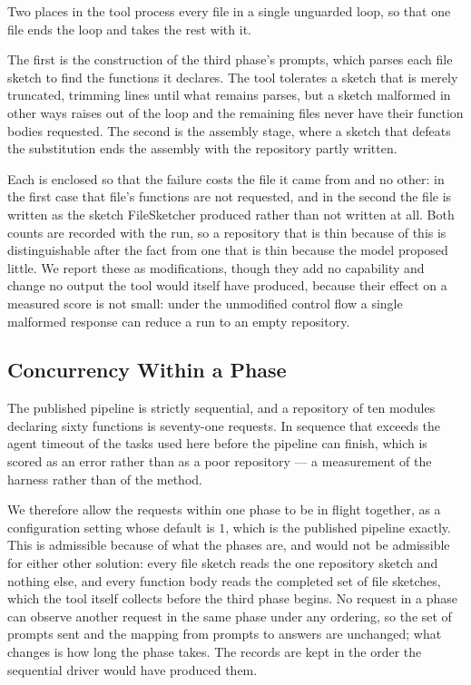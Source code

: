 Two places in the tool process every file in a single unguarded loop, so that
one file ends the loop and takes the rest with it.

The first is the construction of the third phase's prompts, which parses each
file sketch to find the functions it declares. The tool tolerates a sketch that
is merely truncated, trimming lines until what remains parses, but a sketch
malformed in other ways raises out of the loop and the remaining files never
have their function bodies requested. The second is the assembly stage, where a
sketch that defeats the substitution ends the assembly with the repository
partly written.

Each is enclosed so that the failure costs the file it came from and no other:
in the first case that file's functions are not requested, and in the second
the file is written as the sketch FileSketcher produced rather than not written
at all. Both counts are recorded with the run, so a repository that is thin
because of this is distinguishable after the fact from one that is thin because
the model proposed little. We report these as modifications, though they add no
capability and change no output the tool would itself have produced, because
their effect on a measured score is not small: under the unmodified control
flow a single malformed response can reduce a run to an empty repository.

\subsection{Concurrency Within a Phase}

The published pipeline is strictly sequential, and a repository of ten modules
declaring sixty functions is seventy-one requests. In sequence that exceeds the
agent timeout of the tasks used here before the pipeline can finish, which is
scored as an error rather than as a poor repository --- a measurement of the
harness rather than of the method.

We therefore allow the requests within one phase to be in flight together, as a
configuration setting whose default is $1$, which is the published pipeline
exactly. This is admissible because of what the phases are, and would not be
admissible for either other solution: every file sketch reads the one
repository sketch and nothing else, and every function body reads the completed
set of file sketches, which the tool itself collects before the third phase
begins. No request in a phase can observe another request in the same phase
under any ordering, so the set of prompts sent and the mapping from prompts to
answers are unchanged; what changes is how long the phase takes. The records
are kept in the order the sequential driver would have produced them.

